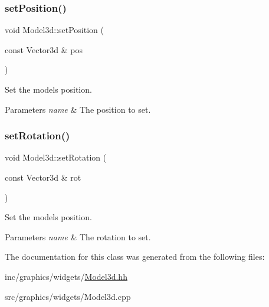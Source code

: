\subsubsection{\texorpdfstring{set\+Position()}{setPosition()}}
{\footnotesize\ttfamily void Model3d\+::set\+Position (\begin{DoxyParamCaption}\item[{const Vector3d \&}]{pos }\end{DoxyParamCaption})}



Set the model\textquotesingle{}s position. 


\begin{DoxyParams}{Parameters}
{\em name} & The position to set. \\
\hline
\end{DoxyParams}
\mbox{\label{classModel3d_adc3c185a679687b4bf483f89eb2c20a9}} 
\subsubsection{\texorpdfstring{set\+Rotation()}{setRotation()}}
{\footnotesize\ttfamily void Model3d\+::set\+Rotation (\begin{DoxyParamCaption}\item[{const Vector3d \&}]{rot }\end{DoxyParamCaption})}



Set the model\textquotesingle{}s position. 


\begin{DoxyParams}{Parameters}
{\em name} & The rotation to set. \\
\hline
\end{DoxyParams}


The documentation for this class was generated from the following files\+:\begin{DoxyCompactItemize}
\item 
inc/graphics/widgets/\hyperlink{Model3d_8hh}{Model3d.\+hh}\item 
src/graphics/widgets/Model3d.\+cpp\end{DoxyCompactItemize}
